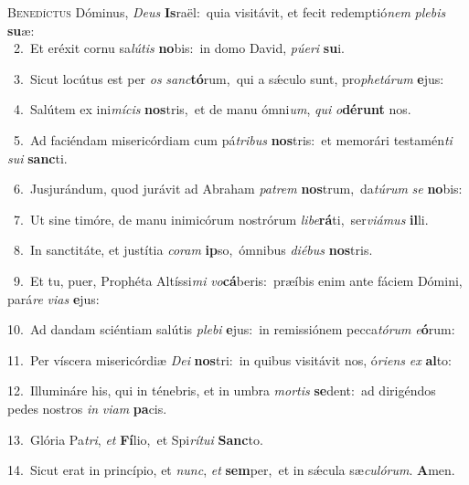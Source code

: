 \lettrine{\initial\textcolor{\initialcolor}{B}}{enedíctus} Dóminus, \textit{De}\-\textit{us} \textbf{Is}\-raël:~\star quia visitávit, et fecit redemptió\textit{nem} \textit{ple}\-\textit{bis} \textbf{su}\-æ:\\
{\numbfont\textcolor{\numbcolor}{~2.}}~Et eréxit cornu sa\-\textit{lú}\-\textit{tis} \textbf{no}\-bis:~\star in domo David, \textit{pú}\-\textit{e}\textit{ri} \textbf{su}\-i.\par
{\numbfont\textcolor{\numbcolor}{~3.}}~Sicut locútus est per \textit{os} \textit{sanc}\-\textbf{tó}rum,~\star qui a sǽculo sunt, pro\-\textit{phe}\-\textit{tá}\textit{rum} \textbf{e}\-jus:\par
{\numbfont\textcolor{\numbcolor}{~4.}}~Salútem ex ini\-\textit{mí}\-\textit{cis} \textbf{nos}\-tris,~\star et de manu ómni\-\textit{um}\-, \textit{qui} \textit{o}\-\textbf{dé}\textbf{runt} nos.\par
{\numbfont\textcolor{\numbcolor}{~5.}}~Ad faciéndam misericórdiam cum pá\-\textit{tri}\-\textit{bus} \textbf{nos}\-tris:~\star et memorári testamén\textit{ti} \textit{su}\-\textit{i} \textbf{sanc}\-ti.\par
{\numbfont\textcolor{\numbcolor}{~6.}}~Jusjurándum, quod jurávit ad Abraham \textit{pa}\-\textit{trem} \textbf{nos}\-trum,~\star da\-\textit{tú}\-\textit{rum} \textit{se} \textbf{no}\-bis:\par
{\numbfont\textcolor{\numbcolor}{~7.}}~Ut sine timóre, de manu inimicórum nostrórum \textit{li}\-\textit{be}\textbf{rá}ti,~\star ser\-\textit{vi}\-\textit{á}\textit{mus} \textbf{il}\-li.\par
{\numbfont\textcolor{\numbcolor}{~8.}}~In sanctitáte, et justítia \textit{co}\-\textit{ram} \textbf{ip}\-so,~\star ómnibus \textit{di}\-\textit{é}\textit{bus} \textbf{nos}\-tris.\par
{\numbfont\textcolor{\numbcolor}{~9.}}~Et tu, puer, Prophéta Altíssi\textit{mi} \textit{vo}\-\textbf{cá}beris:~\star præíbis enim ante fáciem Dómini, pará\textit{re} \textit{vi}\-\textit{as} \textbf{e}\-jus:\par
{\numbfont\textcolor{\numbcolor}{10.}}~Ad dandam sciéntiam salútis \textit{ple}\-\textit{bi} \textbf{e}\-jus:~\star in remissiónem pecca\-\textit{tó}\-\textit{rum} \textit{e}\-\textbf{ó}rum:\par
{\numbfont\textcolor{\numbcolor}{11.}}~Per víscera misericórdiæ \textit{De}\-\textit{i} \textbf{nos}\-tri:~\star in quibus visitávit nos, ó\-\textit{ri}\-\textit{ens} \textit{ex} \textbf{al}\-to:\par
{\numbfont\textcolor{\numbcolor}{12.}}~Illumináre his, qui in ténebris, et in umbra \textit{mor}\-\textit{tis} \textbf{se}\-dent:~\star ad dirigéndos pedes nostros \textit{in} \textit{vi}\-\textit{am} \textbf{pa}\-cis.\par
{\numbfont\textcolor{\numbcolor}{13.}}~Glória Pa\-\textit{tri}\-, \textit{et} \textbf{Fí}\-lio,~\star et Spi\-\textit{rí}\-\textit{tu}\textit{i} \textbf{Sanc}\-to.\par
{\numbfont\textcolor{\numbcolor}{14.}}~Sicut erat in princípio, et \textit{nunc}\-, \textit{et} \textbf{sem}\-per,~\star et in sǽcula sæ\-\textit{cu}\-\textit{ló}\textit{rum}. \textbf{A}\-men.\par
